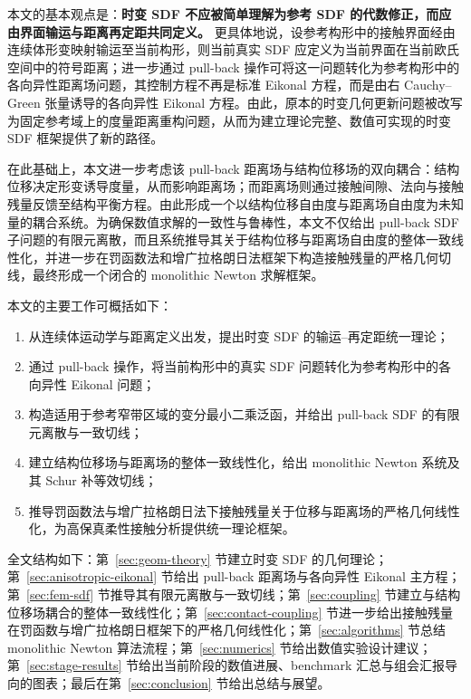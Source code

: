 \documentclass[12pt,a4paper]{ctexart}
\numberwithin{equation}{section}
\begin{document}
本文的基本观点是：\textbf{时变 SDF 不应被简单理解为参考 SDF 的代数修正，而应由界面输运与距离再定距共同定义。} 更具体地说，设参考构形中的接触界面经由连续体形变映射输运至当前构形，则当前真实 SDF 应定义为当前界面在当前欧氏空间中的符号距离；进一步通过 pull-back 操作可将这一问题转化为参考构形中的各向异性距离场问题，其控制方程不再是标准 Eikonal 方程，而是由右 Cauchy--Green 张量诱导的各向异性 Eikonal 方程。由此，原本的时变几何更新问题被改写为固定参考域上的度量距离重构问题，从而为建立理论完整、数值可实现的时变 SDF 框架提供了新的路径。

在此基础上，本文进一步考虑该 pull-back 距离场与结构位移场的双向耦合：结构位移决定形变诱导度量，从而影响距离场；而距离场则通过接触间隙、法向与接触残量反馈至结构平衡方程。由此形成一个以结构位移自由度与距离场自由度为未知量的耦合系统。为确保数值求解的一致性与鲁棒性，本文不仅给出 pull-back SDF 子问题的有限元离散，而且系统推导其关于结构位移与距离场自由度的整体一致线性化，并进一步在罚函数法和增广拉格朗日法框架下构造接触残量的严格几何切线，最终形成一个闭合的 monolithic Newton 求解框架。

本文的主要工作可概括如下：
\begin{enumerate}[label=(\arabic*)]
    \item 从连续体运动学与距离定义出发，提出时变 SDF 的输运--再定距统一理论；
    \item 通过 pull-back 操作，将当前构形中的真实 SDF 问题转化为参考构形中的各向异性 Eikonal 问题；
    \item 构造适用于参考窄带区域的变分最小二乘泛函，并给出 pull-back SDF 的有限元离散与一致切线；
    \item 建立结构位移场与距离场的整体一致线性化，给出 monolithic Newton 系统及其 Schur 补等效切线；
    \item 推导罚函数法与增广拉格朗日法下接触残量关于位移与距离场的严格几何线性化，为高保真柔性接触分析提供统一理论框架。
\end{enumerate}

全文结构如下：第~\ref{sec:geom-theory} 节建立时变 SDF 的几何理论；第~\ref{sec:anisotropic-eikonal} 节给出 pull-back 距离场与各向异性 Eikonal 主方程；第~\ref{sec:fem-sdf} 节推导其有限元离散与一致切线；第~\ref{sec:coupling} 节建立与结构位移场耦合的整体一致线性化；第~\ref{sec:contact-coupling} 节进一步给出接触残量在罚函数与增广拉格朗日框架下的严格几何线性化；第~\ref{sec:algorithms} 节总结 monolithic Newton 算法流程；第~\ref{sec:numerics} 节给出数值实验设计建议；第~\ref{sec:stage-results} 节给出当前阶段的数值进展、benchmark 汇总与组会汇报导向的图表；最后在第~\ref{sec:conclusion} 节给出总结与展望。
\end{document}
